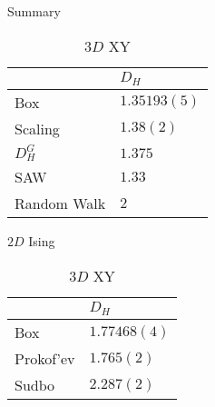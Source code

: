 \documentclass[10pt]{beamer}
\begin{document}
\begin{frame}{Summary}
    \begin{table}
        \parbox{.45\linewidth}{
            \centering
            \begin{tabular}{l|l}
                               & $D_H$          \\ \hline
                Box            & $1.35193(5)$   \\ \hline
                Scaling        & $1.38(2)$      \\ \hline
                $D_H^G$        & $1.375$        \\ \hline
                SAW            & $1.33$         \\ \hline
                Random Walk    & $2$                          
            \end{tabular}
            \caption{$2D$ Ising}
        }
        \hfill
        \parbox{.45\linewidth}{
            \centering
            \begin{tabular}{l|l}
                            & $D_H$           \\ \hline
                Box         & $1.77468(4)$    \\ \hline
                Prokof'ev   & $1.765(2)$      \\ \hline
                Sudbo       & $2.287(2)$  
            \end{tabular}
            \caption{$3D$ XY}
        }
    \end{table}
\end{frame}
\end{document}
